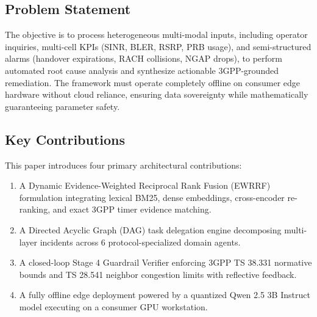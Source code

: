 \documentclass[conference]{IEEEtran}
\begin{document}
\subsection{Problem Statement}
The objective is to process heterogeneous multi-modal inputs, including operator inquiries, multi-cell KPIs (SINR, BLER, RSRP, PRB usage), and semi-structured alarms (handover expirations, RACH collisions, NGAP drops), to perform automated root cause analysis and synthesize actionable 3GPP-grounded remediation. The framework must operate completely offline on consumer edge hardware without cloud reliance, ensuring data sovereignty while mathematically guaranteeing parameter safety.

\subsection{Key Contributions}
This paper introduces four primary architectural contributions:
\begin{enumerate}
    \item A Dynamic Evidence-Weighted Reciprocal Rank Fusion (EWRRF) formulation integrating lexical BM25, dense embeddings, cross-encoder re-ranking, and exact 3GPP timer evidence matching.
    \item A Directed Acyclic Graph (DAG) task delegation engine decomposing multi-layer incidents across 6 protocol-specialized domain agents.
    \item A closed-loop Stage 4 Guardrail Verifier enforcing 3GPP TS 38.331 normative bounds and TS 28.541 neighbor congestion limits with reflective feedback.
    \item A fully offline edge deployment powered by a quantized Qwen 2.5 3B Instruct model executing on a consumer GPU workstation.
\end{enumerate}
\end{document}
